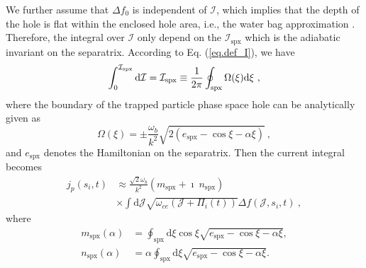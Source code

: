 We further assume that $\Delta f_0$ is independent of $\mathcal{I}$, which implies that the depth of the hole is flat within the enclosed hole area, i.e., the water bag approximation \cite{omura_theory_2008,hezaveh2021}. 
Therefore, the integral over $\mathcal{I}$ only depend on the $\mathcal{I}_\mathrm{spx}$ which is the 
 adiabatic invariant on the separatrix. 
According to Eq. (\ref{eq.def_I}), we have
\begin{equation}
    \int^{\mathcal{I}_\mathrm{s p x}}_0 \mathrm{d}\mathcal{I} = \mathcal{I}_\mathrm{s p x} \equiv {1\over2\pi} \oint_\mathrm{s p x} \Omega (\xi) \mathrm{d} \xi~,
\end{equation}
where the boundary of the trapped particle phase space hole can be analytically given as
\begin{equation}
    \Omega(\xi) = \pm \frac{\omega_b}{k^2} \sqrt{2 (e_\mathrm{spx}-\cos \xi - \alpha \xi)}~,
\end{equation}
and $e_\mathrm{spx}$ denotes the Hamiltonian on the separatrix.
Then the current integral becomes  
\begin{equation}\label{eq.adi_J}
    \begin{aligned}
    j_p(s_i,t) & \approx \frac{\sqrt{2} \omega_b}{k^2}  \left(m_\mathrm{s p x}+\imath ~ n_\mathrm{s p x}\right) \\
    & \times  \int \mathrm{d} \mathcal{J} \sqrt{ \omega_{c e}(\mathcal{J}+\Pi_i(t))} \Delta f(\mathcal{J},s_i,t) ~,
    \end{aligned}
\end{equation}
where
\begin{equation}\label{eq.function}
    \begin{aligned}
        m_\mathrm{spx}(\alpha) & = \oint_\mathrm{s p x} \mathrm{d} \xi \cos \xi \sqrt{e_\mathrm{s p x}-\cos \xi-\alpha \xi}, 
        \\
        n_\mathrm{spx}(\alpha) &  = \alpha \oint_\mathrm{s p x} \mathrm{d} \xi \sqrt{e_\mathrm{s p x}-\cos \xi-\alpha \xi}.
    \end{aligned}
\end{equation}
